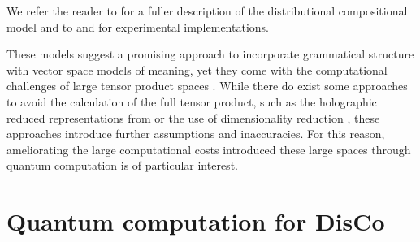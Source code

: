 \noindent We refer the reader to \cite{coecke2010mathematical} for a fuller description of the distributional compositional model and to \cite{experimental-catcompdist} and \cite{kartsaklis2012unified} for experimental implementations.

These models suggest a promising approach to incorporate grammatical structure with vector space models of meaning, yet they come with the computational challenges of large tensor product spaces \cite{GrefenstetteThesis2013}. While there do exist some approaches to avoid the calculation of the full tensor product, such as the holographic reduced representations from \cite{plate1991holographic} or the use of dimensionality reduction \cite{polajnar2013learning}, these approaches introduce further assumptions and inaccuracies.  For this reason, ameliorating the large computational costs introduced these large spaces through quantum computation is of particular interest.

\section{Quantum computation for DisCo}

